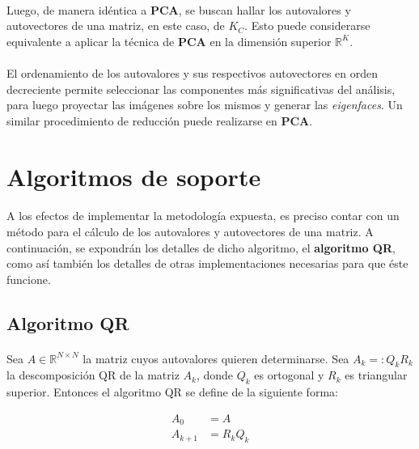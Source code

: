 \documentclass[12pt, twocolumn]{article}
\begin{document}
	\paragraph{} Luego, de manera idéntica a \textbf{PCA}, se buscan hallar los autovalores y autovectores de una matriz, en este caso, de $K_{C}$. Esto puede considerarse equivalente a aplicar la técnica de \textbf{PCA} en la dimensión superior $\mathbb{R}^{K}$.
	
	\paragraph{} El ordenamiento de los autovalores y sus respectivos autovectores en orden decreciente permite seleccionar las componentes más significativas del análisis, para luego proyectar las imágenes sobre los mismos y generar las \textit{eigenfaces}. Un similar procedimiento de reducción puede realizarse en \textbf{PCA}.
	
	
	\section{Algoritmos de soporte}
	
	\paragraph{} A los efectos de implementar la metodología expuesta, es preciso contar con un método para el cálculo de los autovalores y autovectores de una matriz. A continuación, se expondrán los detalles de dicho algoritmo, el \textbf{algoritmo QR}, como así también los detalles de otras implementaciones necesarias para que éste funcione.
	
	\subsection{Algoritmo QR}
	
	\paragraph{} Sea $A \in \mathbb{R}^{N \times N}$ la matriz cuyos autovalores quieren determinarse. Sea $A_{k}=:Q_{k}R_{k}$ la descomposición QR de la matriz $A_{k}$, donde $Q_{k}$ es ortogonal y $R_{k}$ es triangular superior. Entonces el algoritmo QR se define de la siguiente forma:
	
	\begin{align}
		A_{0} &= A \\
		A_{k+1} &= R_{k}Q_{k}
	\end{align}
	
\end{document}
